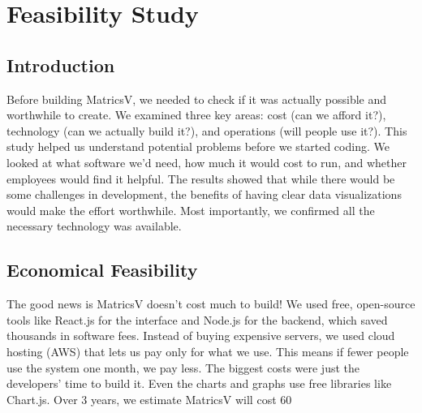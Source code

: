 \chapter{Feasibility Study}


\section{Introduction}


Before building MatricsV, we needed to check if it was actually possible and worthwhile to create. We examined three key areas: cost (can we afford it?), technology (can we actually build it?), and operations (will people use it?). This study helped us understand potential problems before we started coding. We looked at what software we'd need, how much it would cost to run, and whether employees would find it helpful. The results showed that while there would be some challenges in development, the benefits of having clear data visualizations would make the effort worthwhile. Most importantly, we confirmed all the necessary technology was available.





\section{Economical Feasibility}

The good news is MatricsV doesn't cost much to build! We used free, open-source tools like React.js for the interface and Node.js for the backend, which saved thousands in software fees. Instead of buying expensive servers, we used cloud hosting (AWS) that lets us pay only for what we use. This means if fewer people use the system one month, we pay less. The biggest costs were just the developers' time to build it. Even the charts and graphs use free libraries like Chart.js. Over 3 years, we estimate MatricsV will cost 60%

